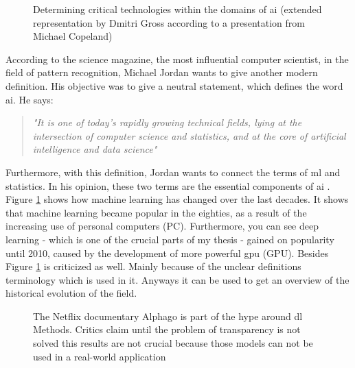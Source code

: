 \begin{figure}[!htp]
	\centering
	\caption{Determining critical technologies within the domains of \Gls{ai} (extended representation by Dmitri Gross according to a presentation from Michael Copeland) \cite{Gross2017} \cite{COPELAND2017}}
	\label{fig:04_history_of_machine_learning}
\end{figure}

According to the science magazine, the most influential computer scientist, in the field of pattern recognition, Michael Jordan wants to give another modern definition. His objective was to give a neutral statement, which defines the word \gls{ai}. He says:

\begin{quote}
	\textit{"It is one of today's rapidly growing technical fields, lying at the intersection of computer science and statistics, and at the core of artificial intelligence and data science" \cite{Bohannon2016} \cite{Jordan255}}
\end{quote}

Furthermore, with this definition, Jordan wants to connect the terms of \gls{ml} and statistics. In his opinion, these two terms are the essential components of \Gls{ai} \cite{MichaelJordan2018}. Figure \ref{fig:04_history_of_machine_learning} shows how machine learning has changed over the last decades. It shows that machine learning became popular in the eighties, as a result of the increasing use of personal computers (PC). Furthermore, you can see deep learning - which is one of the crucial parts of my thesis - gained on popularity until 2010, caused by the development of more powerful \Gls{gpu} (GPU). Besides Figure \ref{fig:04_history_of_machine_learning} is criticized as well. Mainly because of the unclear definitions terminology which is used in it. Anyways it can be used to get an overview of the historical evolution of the field. 

\begin{figure}[htp]
	\centering
	\caption{The Netflix documentary Alphago is part of the hype around \gls{dl} Methods. Critics claim until the problem of transparency is not solved this results are not crucial because those models can not be used in a real-world application \cite{Thetruec1:online}}
	\label{fig:05_deep_learning_sucess_with_alpha_go}
\end{figure}

